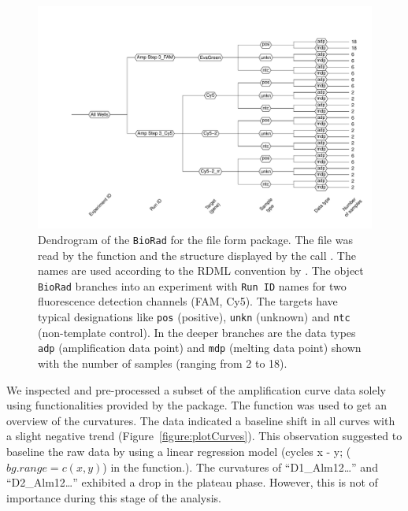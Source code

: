 \begin{figure}[htbp]
  \centering
  \includegraphics[clip=true, width=13cm]{figures/RDML_dendrogram.pdf}
  \caption{Dendrogram of the \texttt{BioRad} for the 
 file form  package. The file was 
read by the  function and the structure displayed by the call 
. The names are used according to the RDML 
convention by \citet{lefever_2009}. The object \texttt{BioRad} branches into an 
experiment with \texttt{Run ID} names for two fluorescence detection channels 
(FAM, Cy5). The targets have typical designations like \texttt{pos} (positive), 
\texttt{unkn} (unknown) and \texttt{ntc} (non-template control). In the deeper 
branches are the data types \texttt{adp} (amplification data point) and 
\texttt{mdp} (melting data point) shown with the number of samples (ranging from 
2 to 18).
} 
\label{figure:RDML_dendrogram}
\end{figure}

We inspected and pre-processed a subset of the amplification curve data solely 
using functionalities provided by the  package. The 
 function was used to get an overview of the curvatures. The 
data indicated a baseline shift in all curves with a slight negative trend 
(Figure~\ref{figure:plotCurves}). This observation suggested to baseline the raw 
data by using a linear regression model (cycles x - y; ($bg.range = c(x, y)$) in 
the  function.). The curvatures of ``D1\_Alm12\ldots'' and 
``D2\_Alm12\ldots'' exhibited a drop in the plateau phase. However, this is not 
of importance during this stage of the analysis.

